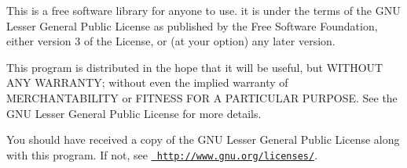 This is a free software library for anyone to use. it is under the terms of the GNU Lesser General Public License as published by the Free Software Foundation, either version 3 of the License, or (at your option) any later version.

This program is distributed in the hope that it will be useful, but WITHOUT ANY WARRANTY; without even the implied warranty of MERCHANTABILITY or FITNESS FOR A PARTICULAR PURPOSE. See the GNU Lesser General Public License for more details.

You should have received a copy of the GNU Lesser General Public License along with this program. If not, see \href{http://www.gnu.org/licenses/}{\texttt{ http\+://www.\+gnu.\+org/licenses/}}. 